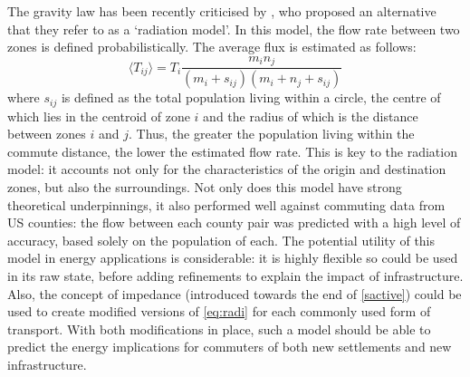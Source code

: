 The gravity law has been recently criticised by
\citet{Simini2012}, who proposed an alternative that they refer to as a
`radiation model'. In this model, the flow rate between two zones is defined
probabilistically. The average flux is estimated as follows:
\begin{equation}
\langle T_{ij} \rangle = T_i \frac{m_{i} n_{j}} {(m_i + s_{ij})(m_i + n_j + s_{ij}) }
\label{eq:radi}
\end{equation}
where $s_{ij}$ is defined as the total population living within a circle, the
centre of which lies in the centroid of zone $i$ and the radius of which is
the distance between zones $i$ and $j$. Thus, the greater the population
living within the commute distance, the lower the estimated flow rate.
This is key to the radiation model: it accounts not only for the characteristics
of the origin and destination zones, but also the surroundings.
Not only does this model have strong theoretical underpinnings, it also
performed well against commuting data from US counties: the flow between
each county pair was predicted with a high level of accuracy, based solely
on the population of each. The potential utility of this model in
energy applications is considerable: it is highly flexible so could be used in its
raw state, before adding refinements to explain the impact of infrastructure.
Also, the concept of impedance (introduced towards the end of \cref{sactive})
could be used to create modified versions of \cref{eq:radi}
for each commonly used form of transport. With both modifications in place,
such a model should be able to predict the energy implications for commuters of both
new settlements and new infrastructure.



